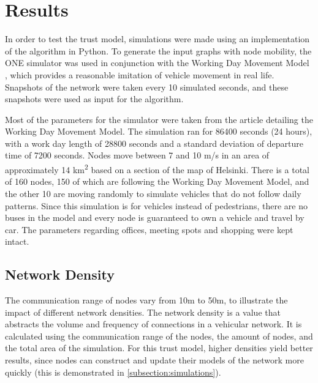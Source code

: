 \documentclass[conference]{IEEEtran}
\begin{document}


\section{Results}
\label{section:results}

In order to test the trust model, simulations were made using an implementation of the algorithm in Python.
To generate the input graphs with node mobility, the ONE simulator \cite{keranen2009one} was used in conjunction with the Working Day Movement Model \cite{ekman2008working}, which provides a reasonable imitation of vehicle movement in real life.
Snapshots of the network were taken every 10 simulated seconds, and these snapshots were used as input for the algorithm.

Most of the parameters for the simulator were taken from the article detailing the Working Day Movement Model.
The simulation ran for 86400 seconds (24 hours), with a work day length of 28800 seconds and a standard deviation of departure time of 7200 seconds.
Nodes move between 7 and 10 m/s in an area of approximately 14 km\textsuperscript{2} based on a section of the map of Helsinki.
There is a total of 160 nodes, 150 of which are following the Working Day Movement Model, and the other 10 are moving randomly to simulate vehicles that do not follow daily patterns.
Since this simulation is for vehicles instead of pedestrians, there are no buses in the model and every node is guaranteed to own a vehicle and travel by car.
The parameters regarding offices, meeting spots and shopping were kept intact.

\subsection{Network Density}
The communication range of nodes vary from 10m to 50m, to illustrate the impact of different network densities.
The network density is a value that abstracts the volume and frequency of connections in a vehicular network.
It is calculated using the communication range of the nodes, the amount of nodes, and the total area of the simulation.
For this trust model, higher densities yield better results, since nodes can construct and update their models of the network more quickly (this is demonstrated in \autoref{subsection:simulations}).
\end{document}

